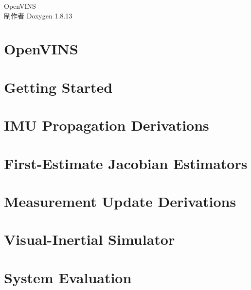 \documentclass[twoside]{book}
\newcommand{\+}{\discretionary{\mbox{\scriptsize$\hookleftarrow$}}{}{}}
\newcommand{\clearemptydoublepage}{%
  \newpage{\pagestyle{empty}\cleardoublepage}%
}
\begin{document}
\begin{CJK}{UTF8}{gbsn}

\hypersetup{pageanchor=false,
             bookmarksnumbered=true,
             pdfencoding=unicode
            }
\begin{titlepage}
\vspace*{7cm}
\begin{center}%
{\Large Open\+V\+I\+NS }\\
\vspace*{1cm}
{\large 制作者 Doxygen 1.8.13}\\
\end{center}
\end{titlepage}
\clearemptydoublepage
{}
\tableofcontents
\clearemptydoublepage
{}
\hypersetup{pageanchor=true}

\chapter{Open\+V\+I\+NS}
\label{index}\hypertarget{index}{}
\chapter{Getting Started}
\label{getting-started}

\chapter{I\+MU Propagation Derivations}
\label{propagation}

\chapter{First-\/\+Estimate Jacobian Estimators}
\label{fej}

\chapter{Measurement Update Derivations}
\label{update}

\chapter{Visual-\/\+Inertial Simulator}
\label{simulation}

\chapter{System Evaluation}
\label{evaluation}


\end{CJK}
\end{document}
